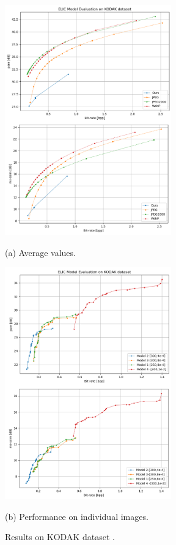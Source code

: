\documentclass{article}
\begin{document}
\pagebreak

\begin{figure}[h!]
\begin{minipage}[b]{0.8\linewidth}
    \centering
    \includegraphics[width=7.2cm]{kodak_fixed.png}
    \centerline{(a) Average values.}\medskip
\end{minipage}
\begin{minipage}[b]{0.8\linewidth}
    
    \centering
    \includegraphics[width=7.2cm]{kodak_per_fixed.png}
    \centerline{(b) Performance on individual images.}\medskip
\end{minipage}
    \label{fig:results}
    \caption{Results on KODAK dataset \cite{kodak}.}
\end{figure}
\end{document}
